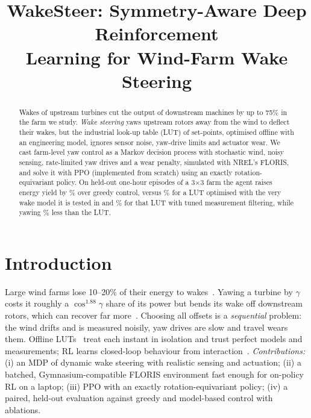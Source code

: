 \documentclass[conference,10pt]{IEEEtran}
\begin{document}
\title{WakeSteer: Symmetry-Aware Deep Reinforcement\\Learning for Wind-Farm Wake Steering}
\author{\IEEEauthorblockN{\TeamMembers}
}
\maketitle

\begin{abstract}
Wakes of upstream turbines cut the output of downstream machines by up to 75\% in the farm we study.
\emph{Wake steering} yaws upstream rotors away from the wind to deflect their wakes, but the industrial
look-up table (LUT) of set-points, optimised offline with an engineering model, ignores sensor noise,
yaw-drive limits and actuator wear. We cast farm-level yaw control as a Markov decision process with
stochastic wind, noisy sensing, rate-limited yaw drives and a wear penalty, simulated with NREL's FLORIS, and
solve it with PPO (implemented from scratch) using an exactly rotation-equivariant policy. On \NumEpisodes{}
held-out one-hour episodes of a 3$\times$3 farm the agent raises energy yield by \GainPPO\% over greedy
control, versus \GainLUT\% for a LUT optimised with the very wake model it is tested in and \GainLUTf\% for
that LUT with tuned measurement filtering, while yawing \TravelCutVsLUT\% less than the LUT.
\end{abstract}

\section{Introduction}
Large wind farms lose 10--20\% of their energy to wakes~\cite{barthelmie2009}. Yawing a turbine by $\gamma$
costs it roughly a $\cos^{1.88}\gamma$ share of its power but bends its wake off downstream rotors, which can
recover far more~\cite{bastankhah2016,howland2019,fleming2019}. Choosing all offsets is a \emph{sequential}
problem: the wind drifts and is measured noisily, yaw drives are slow and travel wears them. Offline
LUTs~\cite{fleming2022sr} treat each instant in isolation and trust perfect models and measurements; RL learns
closed-loop behaviour from interaction~\cite{stanfel2020,dong2021,kadoche2023}. \emph{Contributions:} (i) an MDP
of dynamic wake steering with realistic sensing and actuation; (ii) a batched, Gymnasium-compatible FLORIS
environment fast enough for on-policy RL on a laptop; (iii) PPO with an exactly rotation-equivariant
policy; (iv) a paired, held-out evaluation against greedy and model-based control with ablations.
\end{document}
